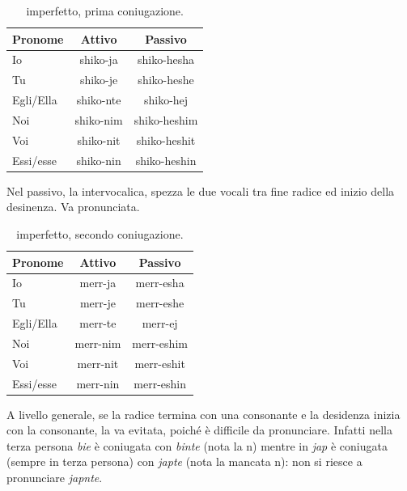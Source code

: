 \begin{table}[H]
    \centering
    \begin{tabular}{lcc}
        \toprule
        Pronome     &   Attivo & Passivo \\
        \midrule
        Io          &   shiko-ja & shiko-hesha \\
        Tu          &   shiko-je & shiko-heshe \\
        Egli/Ella   &   shiko-nte & shiko-hej \\
        Noi         &   shiko-nim & shiko-heshim \\
        Voi         &   shiko-nit & shiko-heshit \\
        Essi/esse   &   shiko-nin & shiko-heshin \\
        \bottomrule
    \end{tabular}
    \caption{imperfetto, prima coniugazione.}
    \label{tbl:verb:primaconiugazione:imperfetto}
\end{table}

\begin{note}
    Nel passivo, la  intervocalica, spezza le due vocali tra fine radice ed inizio della desinenza. Va pronunciata.
\end{note}

\begin{table}[H]
    \centering
    \begin{tabular}{lcc}
        \toprule
        Pronome     &   Attivo & Passivo \\
        \midrule
        Io          &   merr-ja & merr-esha \\
        Tu          &   merr-je & merr-eshe \\
        Egli/Ella   &   merr-te & merr-ej \\
        Noi         &   merr-nim & merr-eshim \\
        Voi         &   merr-nit & merr-eshit \\
        Essi/esse   &   merr-nin & merr-eshin \\
        \bottomrule
    \end{tabular}
    \caption{imperfetto, secondo coniugazione.}
    \label{tbl:verb:primaconiugazione:imperfetto}
\end{table}

A livello generale, se la radice termina con una consonante e la desidenza inizia con la consonante, la  va evitata, poiché è difficile da pronunciare. Infatti nella terza persona \textit{bie} è coniugata con \textit{binte} (nota la n) mentre in \textit{jap} è coniugata (sempre in terza persona) con \textit{japte} (nota la mancata n): non si riesce a pronunciare \textit{japnte}.


